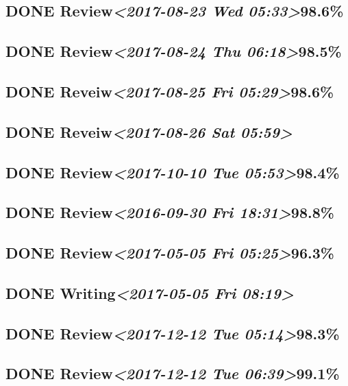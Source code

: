 \documentclass[11pt]{ctexart}
\begin{document}
\subsection{{\bfseries\sffamily DONE} Review\textit{<2017-08-23 Wed 05:33>}98.6\%}
\label{sec:org3a7bd1c}
\subsection{{\bfseries\sffamily DONE} Review\textit{<2017-08-24 Thu 06:18>}98.5\%}
\label{sec:org0650561}
\subsection{{\bfseries\sffamily DONE} Reveiw\textit{<2017-08-25 Fri 05:29>}98.6\%}
\label{sec:orgbb34753}
\subsection{{\bfseries\sffamily DONE} Reveiw\textit{<2017-08-26 Sat 05:59>}}
\label{sec:org200364c}
\subsection{{\bfseries\sffamily DONE} Review\textit{<2017-10-10 Tue 05:53>}98.4\%}
\label{sec:org8c06bfa}
\subsection{{\bfseries\sffamily DONE} Review\textit{<2016-09-30 Fri 18:31>}98.8\%}
\label{sec:orgc54845c}
\subsection{{\bfseries\sffamily DONE} Review\textit{<2017-05-05 Fri 05:25>}96.3\%}
\label{sec:org499138a}
\subsection{{\bfseries\sffamily DONE} Writing\textit{<2017-05-05 Fri 08:19>}}
\label{sec:org9514e97}

\subsection{{\bfseries\sffamily DONE} Review\textit{<2017-12-12 Tue 05:14>}98.3\%}
\label{sec:orgcbd3967}
\subsection{{\bfseries\sffamily DONE} Review\textit{<2017-12-12 Tue 06:39>}99.1\%}
\label{sec:orgc488bd9}
\end{document}
